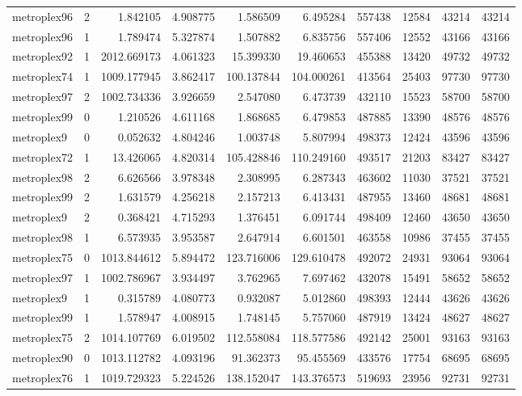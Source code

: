 \begin{longtable}{|l|r|r|r|r|r|r|r|r|r|}
metroplex96 & 2 & 1.842105 & 4.908775 & 1.586509 & 6.495284 & 557438 & 12584 & 43214 & 43214 \\
metroplex96 & 1 & 1.789474 & 5.327874 & 1.507882 & 6.835756 & 557406 & 12552 & 43166 & 43166 \\
metroplex92 & 1 & 2012.669173 & 4.061323 & 15.399330 & 19.460653 & 455388 & 13420 & 49732 & 49732 \\
metroplex74 & 1 & 1009.177945 & 3.862417 & 100.137844 & 104.000261 & 413564 & 25403 & 97730 & 97730 \\
metroplex97 & 2 & 1002.734336 & 3.926659 & 2.547080 & 6.473739 & 432110 & 15523 & 58700 & 58700 \\
metroplex99 & 0 & 1.210526 & 4.611168 & 1.868685 & 6.479853 & 487885 & 13390 & 48576 & 48576 \\
metroplex9 & 0 & 0.052632 & 4.804246 & 1.003748 & 5.807994 & 498373 & 12424 & 43596 & 43596 \\
metroplex72 & 1 & 13.426065 & 4.820314 & 105.428846 & 110.249160 & 493517 & 21203 & 83427 & 83427 \\
metroplex98 & 2 & 6.626566 & 3.978348 & 2.308995 & 6.287343 & 463602 & 11030 & 37521 & 37521 \\
metroplex99 & 2 & 1.631579 & 4.256218 & 2.157213 & 6.413431 & 487955 & 13460 & 48681 & 48681 \\
metroplex9 & 2 & 0.368421 & 4.715293 & 1.376451 & 6.091744 & 498409 & 12460 & 43650 & 43650 \\
metroplex98 & 1 & 6.573935 & 3.953587 & 2.647914 & 6.601501 & 463558 & 10986 & 37455 & 37455 \\
metroplex75 & 0 & 1013.844612 & 5.894472 & 123.716006 & 129.610478 & 492072 & 24931 & 93064 & 93064 \\
metroplex97 & 1 & 1002.786967 & 3.934497 & 3.762965 & 7.697462 & 432078 & 15491 & 58652 & 58652 \\
metroplex9 & 1 & 0.315789 & 4.080773 & 0.932087 & 5.012860 & 498393 & 12444 & 43626 & 43626 \\
metroplex99 & 1 & 1.578947 & 4.008915 & 1.748145 & 5.757060 & 487919 & 13424 & 48627 & 48627 \\
metroplex75 & 2 & 1014.107769 & 6.019502 & 112.558084 & 118.577586 & 492142 & 25001 & 93163 & 93163 \\
metroplex90 & 0 & 1013.112782 & 4.093196 & 91.362373 & 95.455569 & 433576 & 17754 & 68695 & 68695 \\
metroplex76 & 1 & 1019.729323 & 5.224526 & 138.152047 & 143.376573 & 519693 & 23956 & 92731 & 92731 \\

\end{longtable}
